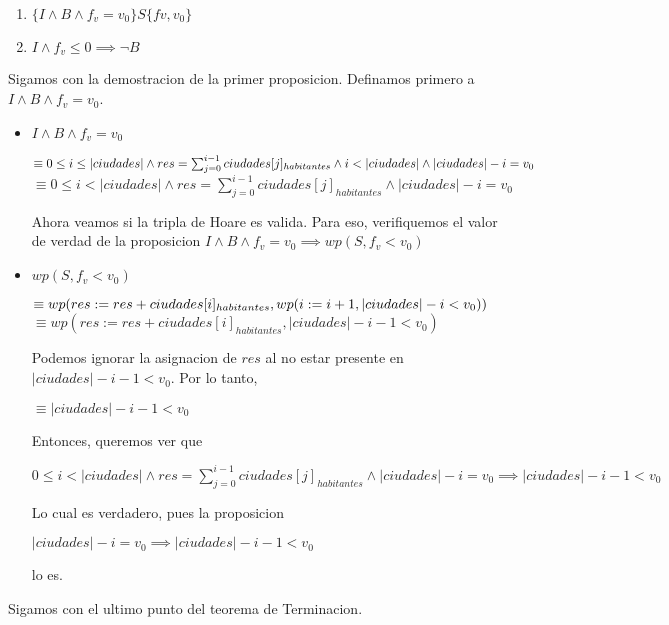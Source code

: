 \documentclass[10pt,a4paper]{article}
\begin{document}
\begin{enumerate}
	\item $\{I \wedge B \wedge f_v = v_0\} S \{fv , v_0\}$
	\item $I \wedge f_v \leq 0 \implies \neg B$
\end{enumerate}
Sigamos con la demostracion de la primer proposicion. Definamos primero a $I \wedge B \wedge f_v = v_0$.
\begin{itemize}
	\item $I \wedge B \wedge f_v = v_0$
	      \begin{adjustwidth}{2em}{}
		      $\equiv 0 \leq i \leq |ciudades| \wedge res = \sum_{j=0}^{i-1}ciudades[j]_{habitantes} \wedge i < |ciudades| \wedge |ciudades| - i = v_0 \newline$
		      $\equiv 0 \leq i < |ciudades| \wedge res = \sum_{j=0}^{i-1}ciudades[j]_{habitantes} \wedge |ciudades|- i = v_0$
	      \end{adjustwidth}
	      Ahora veamos si la tripla de Hoare es valida. Para eso, verifiquemos el valor de verdad de la proposicion $I \wedge B \wedge f_v = v_0 \implies wp(S, f_v < v_0)$
	\item $wp(S,f_v<v_0)$
	      \begin{adjustwidth}{2em}{}
		      $\equiv wp(res:=res+ciudades[i]_{habitantes},wp(i:=i+1,|ciudades|-i<v_0))\newline$
		      $\equiv wp(res:=res+ciudades[i]_{habitantes},|ciudades|-i-1<v_0)$
	      \end{adjustwidth}
	      Podemos ignorar la asignacion de $res$ al no estar presente en $|ciudades|-i-1<v_0$. Por lo tanto,
	      \begin{adjustwidth}{2em}{}
		      $\equiv |ciudades|-i-1 < v_0$
	      \end{adjustwidth}
	      Entonces, queremos ver que
	      \begin{adjustwidth}{2em}{}
		      $0 \leq i < |ciudades| \wedge res = \sum_{j=0}^{i-1}ciudades[j]_{habitantes} \wedge |ciudades| - i = v_0 \implies |ciudades|-i-1 < v_0$
	      \end{adjustwidth}
	      Lo cual es verdadero, pues la proposicion
	      \begin{adjustwidth}{2em}{}
		      $|ciudades|-i=v_0 \implies |ciudades| - i-1<v_0$
	      \end{adjustwidth}
	      lo es.
\end{itemize}
Sigamos con el ultimo punto del teorema de Terminacion.

\end{document}
